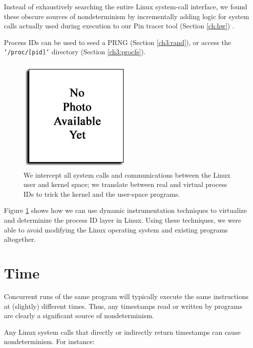 Instead of exhaustively searching the entire
Linux system-call interface, we found these obscure sources of
nondeterminism by incrementally adding logic 
for system calls actually used during execution
to our Pin tracer tool (Section \ref{ch:hw}) .

Process IDs can be used to seed a PRNG (Section \ref{ch3:rand}),
or access the \texttt{`/proc/[pid]'} directory (Section \ref{ch3:procfs}). 

\begin{figure}[h]
  \center
  \includegraphics[trim=0cm 0cm 0cm 0cm, scale=0.75]{none.jpg}
  \caption[Virtualizing the process ID layer using Pin]%
  {We intercept all system calls and communications
  between the Linux user and kernel space; we
  translate between real and virtual process IDs
  to trick the kernel and the user-space programs.}
  \label{ch3:pidfig}
\end{figure} 

Figure \ref{ch3:pidfig} shows how we can use dynamic instrumentation
techniques to virtualize and determinize the process ID layer in Linux.
Using these techniques, we were able to avoid modifying
the Linux operating system and existing programs
altogether.

\section{Time} \label{ch3:time}
Concurrent runs of the same program will typically
execute the same instructions at (slightly) different times.
Thus, any timestamps read or written
by programs are clearly a significant source of nondeterminism.

Any Linux system calls that directly or indirectly return timestamps
can cause nondeterminism. For instance:

